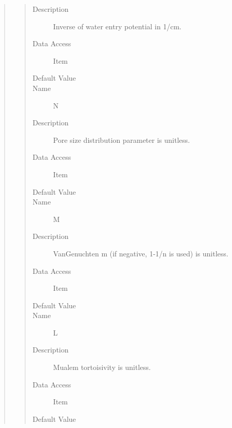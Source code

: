 \documentclass[letterpaper,10pt,english]{sphinxmanual}
\begin{document}
\begin{quote}
\begin{description}
\begin{quote}
\begin{description}
\item[{Description}] \leavevmode
Inverse of water entry potential in 1/cm.

\item[{Data Access}] \leavevmode
Item

\item[{Default Value}] \leavevmode
{}

\item[{Name}] \leavevmode
N

\item[{Description}] \leavevmode
Pore size distribution parameter is unitless.

\item[{Data Access}] \leavevmode
Item

\item[{Default Value}] \leavevmode
{}

\item[{Name}] \leavevmode
M

\item[{Description}] \leavevmode
VanGenuchten m (if negative, 1-1/n is used) is unitless.

\item[{Data Access}] \leavevmode
Item

\item[{Default Value}] \leavevmode
{}

\item[{Name}] \leavevmode
L

\item[{Description}] \leavevmode
Mualem tortoisivity is unitless.

\item[{Data Access}] \leavevmode
Item

\item[{Default Value}] \leavevmode
{}


\end{description}
\end{quote}
\end{description}
\end{quote}
\end{document}
